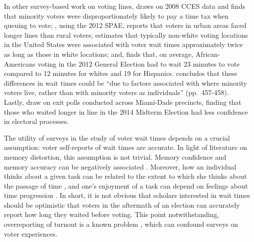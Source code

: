 \documentclass[12pt,titlepage]{article}
\begin{document}


In other survey-based work on voting lines, \cite{mukherjee:timetax}
draws on 2008 CCES data and finds that minority voters were
disproportionately likely to pay a time tax when queuing to vote;
\citet{kimball:voting}, using the 2012 SPAE, reports that voters in
urban areas faced longer lines than rural voters;
\citet{pettigrew:racegapwaittimes} estimates that typically non-white
voting locations in the United States were associated with voter wait
times approximately twice as long as those in white locations; and,
\cite{stewart:waitingtovote2012} finds that, on average,
African-Americans voting in the 2012 General Election had to wait 23
minutes to vote compared to 12 minutes for whites and 19 for
Hispanics. \citeauthor{stewart:waitingtovote2012} concludes that these
differences in wait times could be ``due to factors associated with
where minority voters live, rather than with minority voters as
individuals'' (pp.\ 457-458). Lastly, \cite{herron:confidence} draw on
exit polls conducted across Miami-Dade precincts, finding that those
who waited longer in line in the 2014 Midterm Election had less
confidence in electoral processes.

The utility of surveys in the study of voter wait times depends on a
crucial assumption: voter self-reports of wait times are accurate.  In
light of literature on memory distortion, this assumption is not
trivial. Memory confidence and memory accuracy can be negatively
associated \citep{hirstetal:sept11memories}.  Moreover, how an
individual thinks about a given task can be related to the extent to
which she thinks about the passage of time \citep{conti:timeflies},
and one's enjoyment of a task can depend on feelings about time
progression \citep{sackettetal:timeflies}.  In short, it is not
obvious that scholars interested in wait times should be optimistic
that voters in the aftermath of an election can accurately report how
long they waited before voting.  This point notwithstanding,
overreporting of turnout is a known problem
\citep{ansolhersh:bigdata}, which can confound surveys on voter
experiences.
\end{document}
